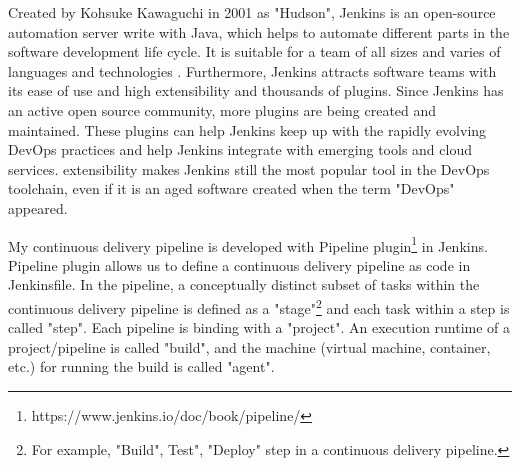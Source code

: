 \par
Created by Kohsuke Kawaguchi in 2001 as "Hudson", Jenkins is an open-source automation server write with Java, which helps to automate different parts in the software development life cycle.
It is suitable for a team of all sizes and varies of languages and technologies \cite{smart2011jenkins}. Furthermore, Jenkins attracts software teams with its ease of use and high extensibility \cite{smart2011jenkins} and thousands of plugins. Since Jenkins has an active open source community, more plugins are being created and maintained. These plugins can help Jenkins keep up with the rapidly evolving DevOps practices and help Jenkins integrate with emerging tools and cloud services. extensibility makes Jenkins still the most popular tool in the DevOps toolchain, even if it is an aged software created when the term "DevOps" appeared.
\par
My continuous delivery pipeline is developed with Pipeline plugin\footnote{https://www.jenkins.io/doc/book/pipeline/} in Jenkins.
Pipeline plugin allows us to define a continuous delivery pipeline as code in Jenkinsfile.
In the pipeline, a conceptually distinct subset of tasks within the continuous delivery pipeline \cite{Pipeline85:online} is defined as a "stage"\footnote{For example, "Build", Test", "Deploy" step in a continuous delivery pipeline.} and each task within a step is called "step". Each pipeline is binding with a "project". An execution runtime of a project/pipeline is called "build", and the machine (virtual machine, container, etc.) for running the build is called "agent".
